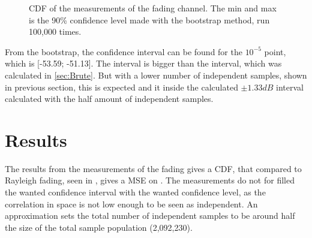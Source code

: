 \begin{figure}[H]

\caption{CDF of the measurements of the fading channel. The min and max is the 90\% confidence level made with the bootstrap method, run 100,000 times.}
\label{CDFFinalBS}
\end{figure}

From the bootstrap, the confidence interval can be found for the $10^{-5}$ point, which is [-53.59; -51.13]. The interval is bigger than the interval, which was calculated in \autoref{sec:Brute}. But with a lower number of independent samples, shown in previous section, this is expected and it inside the calculated $\pm 1.33dB$ interval calculated with the half amount of independent samples.


\section{Results}
The results from the measurements of the fading gives a CDF, that compared to Rayleigh fading, seen in , gives a MSE on . The measurements do not for filled the wanted confidence interval with the wanted confidence level, as the correlation in space is not low enough to be seen as independent. An approximation sets the total number of independent samples to be around half the size of the total sample population (2,092,230).








